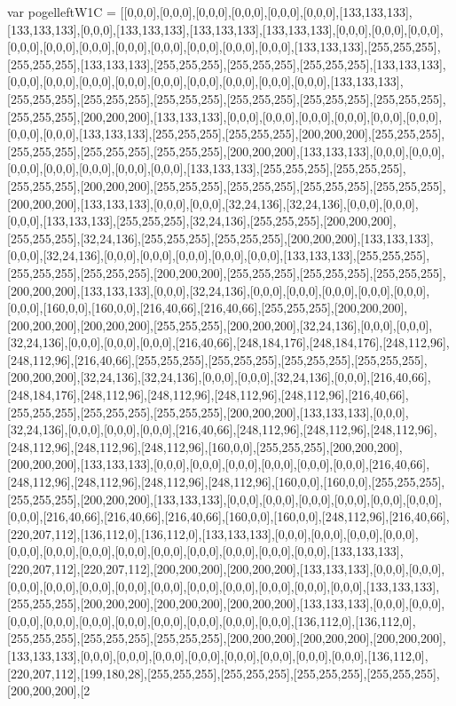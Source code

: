 var pogelleftW1C = [[0,0,0],[0,0,0],[0,0,0],[0,0,0],[0,0,0],[0,0,0],[133,133,133],[133,133,133],[0,0,0],[133,133,133],[133,133,133],[133,133,133],[0,0,0],[0,0,0],[0,0,0],[0,0,0],[0,0,0],[0,0,0],[0,0,0],[0,0,0],[0,0,0],[0,0,0],[0,0,0],[133,133,133],[255,255,255],[255,255,255],[133,133,133],[255,255,255],[255,255,255],[255,255,255],[133,133,133],[0,0,0],[0,0,0],[0,0,0],[0,0,0],[0,0,0],[0,0,0],[0,0,0],[0,0,0],[0,0,0],[133,133,133],[255,255,255],[255,255,255],[255,255,255],[255,255,255],[255,255,255],[255,255,255],[255,255,255],[200,200,200],[133,133,133],[0,0,0],[0,0,0],[0,0,0],[0,0,0],[0,0,0],[0,0,0],[0,0,0],[0,0,0],[133,133,133],[255,255,255],[255,255,255],[200,200,200],[255,255,255],[255,255,255],[255,255,255],[255,255,255],[200,200,200],[133,133,133],[0,0,0],[0,0,0],[0,0,0],[0,0,0],[0,0,0],[0,0,0],[0,0,0],[133,133,133],[255,255,255],[255,255,255],[255,255,255],[200,200,200],[255,255,255],[255,255,255],[255,255,255],[255,255,255],[200,200,200],[133,133,133],[0,0,0],[0,0,0],[32,24,136],[32,24,136],[0,0,0],[0,0,0],[0,0,0],[133,133,133],[255,255,255],[32,24,136],[255,255,255],[200,200,200],[255,255,255],[32,24,136],[255,255,255],[255,255,255],[200,200,200],[133,133,133],[0,0,0],[32,24,136],[0,0,0],[0,0,0],[0,0,0],[0,0,0],[0,0,0],[133,133,133],[255,255,255],[255,255,255],[255,255,255],[200,200,200],[255,255,255],[255,255,255],[255,255,255],[200,200,200],[133,133,133],[0,0,0],[32,24,136],[0,0,0],[0,0,0],[0,0,0],[0,0,0],[0,0,0],[0,0,0],[160,0,0],[160,0,0],[216,40,66],[216,40,66],[255,255,255],[200,200,200],[200,200,200],[200,200,200],[255,255,255],[200,200,200],[32,24,136],[0,0,0],[0,0,0],[32,24,136],[0,0,0],[0,0,0],[0,0,0],[216,40,66],[248,184,176],[248,184,176],[248,112,96],[248,112,96],[216,40,66],[255,255,255],[255,255,255],[255,255,255],[255,255,255],[200,200,200],[32,24,136],[32,24,136],[0,0,0],[0,0,0],[32,24,136],[0,0,0],[216,40,66],[248,184,176],[248,112,96],[248,112,96],[248,112,96],[248,112,96],[216,40,66],[255,255,255],[255,255,255],[255,255,255],[200,200,200],[133,133,133],[0,0,0],[32,24,136],[0,0,0],[0,0,0],[0,0,0],[216,40,66],[248,112,96],[248,112,96],[248,112,96],[248,112,96],[248,112,96],[248,112,96],[160,0,0],[255,255,255],[200,200,200],[200,200,200],[133,133,133],[0,0,0],[0,0,0],[0,0,0],[0,0,0],[0,0,0],[0,0,0],[216,40,66],[248,112,96],[248,112,96],[248,112,96],[248,112,96],[160,0,0],[160,0,0],[255,255,255],[255,255,255],[200,200,200],[133,133,133],[0,0,0],[0,0,0],[0,0,0],[0,0,0],[0,0,0],[0,0,0],[0,0,0],[216,40,66],[216,40,66],[216,40,66],[160,0,0],[160,0,0],[248,112,96],[216,40,66],[220,207,112],[136,112,0],[136,112,0],[133,133,133],[0,0,0],[0,0,0],[0,0,0],[0,0,0],[0,0,0],[0,0,0],[0,0,0],[0,0,0],[0,0,0],[0,0,0],[0,0,0],[0,0,0],[0,0,0],[133,133,133],[220,207,112],[220,207,112],[200,200,200],[200,200,200],[133,133,133],[0,0,0],[0,0,0],[0,0,0],[0,0,0],[0,0,0],[0,0,0],[0,0,0],[0,0,0],[0,0,0],[0,0,0],[0,0,0],[0,0,0],[133,133,133],[255,255,255],[200,200,200],[200,200,200],[200,200,200],[133,133,133],[0,0,0],[0,0,0],[0,0,0],[0,0,0],[0,0,0],[0,0,0],[0,0,0],[0,0,0],[0,0,0],[0,0,0],[136,112,0],[136,112,0],[255,255,255],[255,255,255],[255,255,255],[200,200,200],[200,200,200],[200,200,200],[133,133,133],[0,0,0],[0,0,0],[0,0,0],[0,0,0],[0,0,0],[0,0,0],[0,0,0],[0,0,0],[136,112,0],[220,207,112],[199,180,28],[255,255,255],[255,255,255],[255,255,255],[255,255,255],[200,200,200],[2